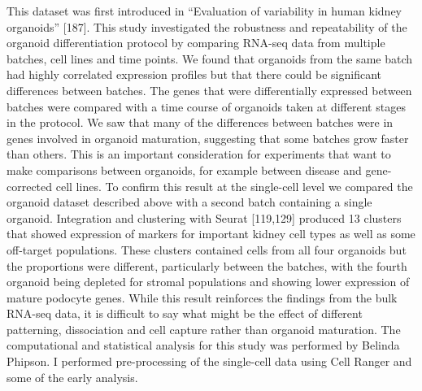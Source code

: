 \documentclass[11pt,a4paper,titlepage,twoside,openright]{style/unimelbthesis}
\theoremstyle{definition}
\theoremstyle{definition}
\theoremstyle{definition}
\theoremstyle{remark}
\begin{document}
\begin{mainmatter}
This dataset was first introduced in \enquote{Evaluation of variability in human kidney organoids} {[}187{]}. This study investigated the robustness and repeatability of the organoid differentiation protocol by comparing RNA-seq data from multiple batches, cell lines and time points. We found that organoids from the same batch had highly correlated expression profiles but that there could be significant differences between batches. The genes that were differentially expressed between batches were compared with a time course of organoids taken at different stages in the protocol. We saw that many of the differences between batches were in genes involved in organoid maturation, suggesting that some batches grow faster than others. This is an important consideration for experiments that want to make comparisons between organoids, for example between disease and gene-corrected cell lines. To confirm this result at the single-cell level we compared the organoid dataset described above with a second batch containing a single organoid. Integration and clustering with Seurat {[}119,129{]} produced 13 clusters that showed expression of markers for important kidney cell types as well as some off-target populations. These clusters contained cells from all four organoids but the proportions were different, particularly between the batches, with the fourth organoid being depleted for stromal populations and showing lower expression of mature podocyte genes. While this result reinforces the findings from the bulk RNA-seq data, it is difficult to say what might be the effect of different patterning, dissociation and cell capture rather than organoid maturation. The computational and statistical analysis for this study was performed by Belinda Phipson. I performed pre-processing of the single-cell data using Cell Ranger and some of the early analysis.


\end{mainmatter}
\end{document}

